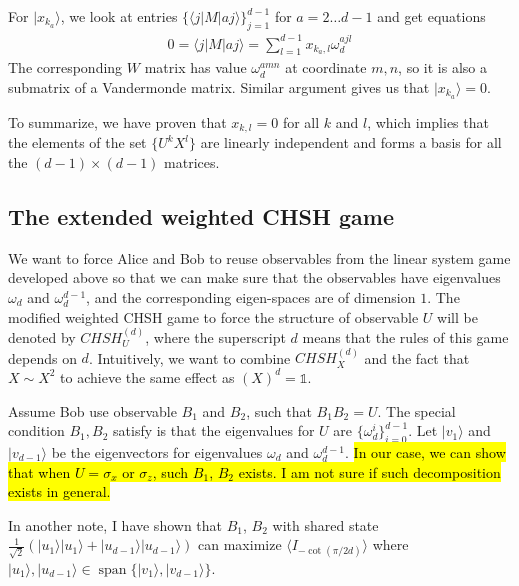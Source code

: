 \documentclass[11pt,letterpaper]{article}
\newcommand{\ket}[1]{|#1\rangle}
\newcommand{\bra}[1]{\langle#1|}
\DeclareMathOperator{\spn}{span}
\newcommand{\1}{\mathbb{1}}
\newcommand{\CHSH}{CHSH^{(d)}}
\theoremstyle{definition}
\begin{document}
For $\ket{x_{k_a}}$, we look at entries $\{\bra{j}M\ket{aj}\}_{j=1}^{d-1}$ for $a = 2 \dots d-1$ and get equations
\begin{align}
	0 = \bra{j}M\ket{aj} = \sum_{l=1}^{d-1} x_{k_a, l} \omega_d^{ajl} 
\end{align}
The corresponding $W$ matrix has value $\omega_d^{amn}$ at coordinate $m,n$,
so it is also a submatrix of a Vandermonde matrix. Similar argument gives us that $\ket{x_{k_a}} = 0$.

To summarize, we have proven that $x_{k,l} = 0$ for all $k$ and $l$, which implies that the elements of the set
$\{ U^k X^l \}$ are linearly independent and forms a basis for all the $(d-1)\times(d-1)$ matrices.
\subsection{The extended weighted CHSH game}
We want to force Alice and Bob to reuse observables 
from the linear system game developed above so that we can make sure that the observables have
eigenvalues $\omega_d$ and $\omega_d^{d-1}$, and the corresponding eigen-spaces are 
of dimension $1$. The modified weighted CHSH game to force the structure of observable $U$ will be
denoted by $\CHSH_U$, where the superscript $d$ means that the rules of this game depends on $d$.
Intuitively, we want to combine $\CHSH_X$ and the fact that $X \sim X^2$ to achieve the same effect as 
$(X)^d = \1$.

Assume Bob use observable $B_1$ and $B_2$, such that $B_1B_2 = U$. 
The special condition $B_1, B_2$ satisfy is that the eigenvalues for 
$U$ are $\{\omega_d^i\}_{i=0}^{d-1}$. Let $\ket{v_1}$ and $\ket{v_{d-1}}$ be the 
eigenvectors for eigenvalues $\omega_d$ and $\omega_d^{d-1}$. 
\hl{In our case, we can show that when $U = \sigma_x$ or $\sigma_z$, such $B_1$, $B_2$ exists. I am not sure if such decomposition exists in general.}

In another note, I have shown that $B_1$, $B_2$ with shared state $\frac{1}{\sqrt{2}} (\ket{u_1}\ket{u_1} + \ket{u_{d-1}}\ket{u_{d-1}})$ 
can maximize $\langle I_{-\cot(\pi/2d)}\rangle$ where $\ket{u_1}, \ket{u_{d-1}} \in \spn\{\ket{v_1}, \ket{v_{d-1}}\}$.
\end{document}
